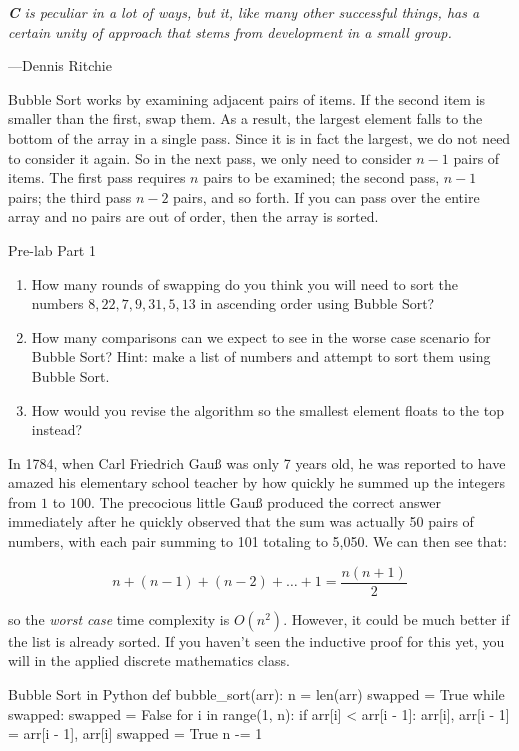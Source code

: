 \documentclass[11pt]{article}
\begin{document}
\epigraph{\emph{\textbf{C} is peculiar in a lot of ways, but it, like
many other successful things, has a certain unity of approach that stems
from development in a small group.}}{---Dennis Ritchie}

\noindent Bubble Sort works by examining adjacent pairs of items. If the
second item is smaller than the first, swap them. As a result, the
largest element falls to the bottom of the array in a single pass. Since
it is in fact the largest, we do not need to consider it again. So in
the next pass, we only need to consider $n-1$ pairs of items. The first
pass requires $n$ pairs to be examined; the second pass, $n-1$ pairs;
the third pass $n-2$ pairs, and so forth. If you can pass over the
entire array and no pairs are out of order, then the array is sorted.

\medskip
\begin{prelab}{Pre-lab Part 1}
  \begin{enumerate}
    \item How many rounds of swapping do you think you will need to sort
      the numbers ${8, 22, 7, 9, 31, 5, 13}$ in ascending order using
      Bubble Sort?
    \item How many comparisons can we expect to see in the worse case
      scenario for Bubble Sort? Hint: make a list of numbers and attempt
      to sort them using Bubble Sort.
    \item How would you revise the algorithm so the smallest element
      floats to the top instead?
  \end{enumerate}
\end{prelab}

In 1784, when Carl Friedrich Gau{\ss} was only 7 years old, he was
reported to have amazed his elementary school teacher by how quickly he
summed up the integers from $1$ to $100$. The precocious little
Gau{\ss} produced the correct answer immediately after he quickly
observed that the sum was actually 50 pairs of numbers, with each pair
summing to 101 totaling to 5,050. We can then see that:

\[
  n+(n-1)+(n-2) + \ldots + 1 = \frac{n(n+1)}{2}
\]

\noindent so the \emph{worst case} time complexity is $O(n^2)$. However, it could
be much better if the list is already sorted. If you haven't seen the
inductive proof for this yet, you will in the applied discrete
mathematics class.

\begin{pythonlisting}{Bubble Sort in Python}
def bubble_sort(arr):
    n = len(arr)
    swapped = True
    while swapped:
        swapped = False
        for i in range(1, n):
            if arr[i] < arr[i - 1]:
                arr[i], arr[i - 1] = arr[i - 1], arr[i]
                swapped = True
        n -= 1
\end{pythonlisting}
\end{document}
